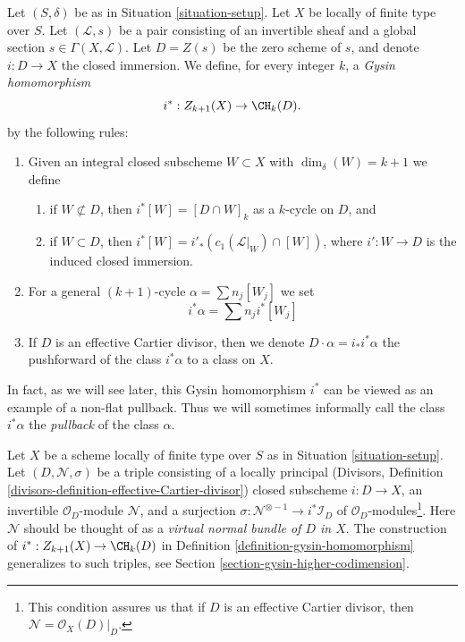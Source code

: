 \begin{definition}
\label{definition-gysin-homomorphism}
Let $(S, \delta)$ be as in Situation \ref{situation-setup}.
Let $X$ be locally of finite type over $S$.
Let $(\mathcal{L}, s)$ be a pair consisting of an invertible
sheaf and a global section $s \in \Gamma(X, \mathcal{L})$.
Let $D = Z(s)$ be the zero scheme of $s$, and
denote $i : D \to X$ the closed immersion.
We define, for every integer $k$, a {\it Gysin homomorphism}
$$
i^* : Z_{k + 1}(X) \to \CH_k(D).
$$
by the following rules:
\begin{enumerate}
\item Given an integral closed subscheme $W \subset X$ with
$\dim_\delta(W) = k + 1$ we define
\begin{enumerate}
\item if $W \not \subset D$, then $i^*[W] = [D \cap W]_k$ as a
$k$-cycle on $D$, and
\item if $W \subset D$, then
$i^*[W] = i'_*(c_1(\mathcal{L}|_W) \cap [W])$,
where $i' : W \to D$ is the induced closed immersion.
\end{enumerate}
\item For a general $(k + 1)$-cycle $\alpha = \sum n_j[W_j]$
we set
$$
i^*\alpha = \sum n_j i^*[W_j]
$$
\item If $D$ is an effective Cartier divisor, then we denote
$D \cdot \alpha = i_*i^*\alpha$ the pushforward of the class $i^*\alpha$
to a class on $X$.
\end{enumerate}
\end{definition}

\noindent
In fact, as we will see later, this Gysin homomorphism $i^*$ can be viewed
as an example of a non-flat pullback. Thus we will sometimes informally
call the class $i^*\alpha$ the {\it pullback} of the class $\alpha$.

\begin{remark}
\label{remark-generalize-to-virtual}
Let $X$ be a scheme locally of finite type over $S$ as in
Situation \ref{situation-setup}. Let $(D, \mathcal{N}, \sigma)$
be a triple consisting of a locally principal (Divisors, Definition
\ref{divisors-definition-effective-Cartier-divisor}) closed subscheme
$i : D \to X$, an invertible $\mathcal{O}_D$-module $\mathcal{N}$, and
a surjection $\sigma : \mathcal{N}^{\otimes -1} \to i^*\mathcal{I}_D$
of $\mathcal{O}_D$-modules\footnote{This condition assures us that if
$D$ is an effective Cartier divisor, then $\mathcal{N} = \mathcal{O}_X(D)|_D$.}.
Here $\mathcal{N}$ should be thought of as
a {\it virtual normal bundle of $D$ in $X$}. The construction of
$i^* : Z_{k + 1}(X) \to \CH_k(D)$ in
Definition \ref{definition-gysin-homomorphism}
generalizes to such triples, see
Section \ref{section-gysin-higher-codimension}.
\end{remark}

